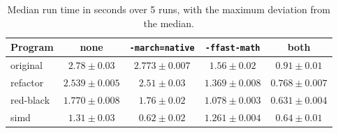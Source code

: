 \begin{table}[h]
    \centering
    \begin{tabular}{lcccc}
        \hline
        Program & none & \texttt{-march=native} & \texttt{-ffast-math} & both \\
        \hline
        original & $2.78 \pm 0.03$ & $2.773 \pm 0.007$ & $1.56 \pm 0.02$ & $0.91 \pm 0.01$ \\
        refactor & $2.539 \pm 0.005$ & $2.51 \pm 0.03$ & $1.369 \pm 0.008$ & $0.768 \pm 0.007$ \\
        red-black & $1.770 \pm 0.008$ & $1.76 \pm 0.02$ & $1.078 \pm 0.003$ & $0.631 \pm 0.004$ \\
        simd & $1.31 \pm 0.03$ & $0.62 \pm 0.02$ & $1.261 \pm 0.004$ & $0.64 \pm 0.01$ \\
        \hline
    \end{tabular}
    \caption{Median run time in seconds over 5 runs, with the maximum deviation from the median.}
\end{table}
